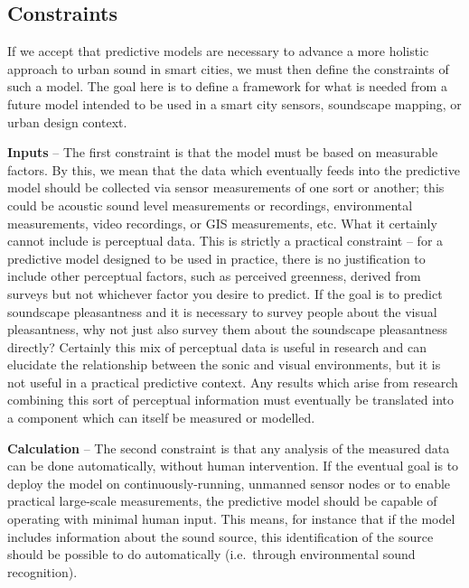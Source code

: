 \documentclass[
  authoryear,
  preprint,
  1p]{elsarticle}
\begin{document}
\subsection{Constraints}\label{constraints}

If we accept that predictive models are necessary to advance a more
holistic approach to urban sound in smart cities, we must then define
the constraints of such a model. The goal here is to define a framework
for what is needed from a future model intended to be used in a smart
city sensors, soundscape mapping, or urban design context.

\textbf{Inputs} -- The first constraint is that the model must be based
on measurable factors. By this, we mean that the data which eventually
feeds into the predictive model should be collected via sensor
measurements of one sort or another; this could be acoustic sound level
measurements or recordings, environmental measurements, video
recordings, or GIS measurements, etc. What it certainly cannot include
is perceptual data. This is strictly a practical constraint -- for a
predictive model designed to be used in practice, there is no
justification to include other perceptual factors, such as perceived
greenness, derived from surveys but not whichever factor you desire to
predict. If the goal is to predict soundscape pleasantness and it is
necessary to survey people about the visual pleasantness, why not just
also survey them about the soundscape pleasantness directly? Certainly
this mix of perceptual data is useful in research and can elucidate the
relationship between the sonic and visual environments, but it is not
useful in a practical predictive context. Any results which arise from
research combining this sort of perceptual information must eventually
be translated into a component which can itself be measured or modelled.

\textbf{Calculation} -- The second constraint is that any analysis of
the measured data can be done automatically, without human intervention.
If the eventual goal is to deploy the model on continuously-running,
unmanned sensor nodes or to enable practical large-scale measurements,
the predictive model should be capable of operating with minimal human
input. This means, for instance that if the model includes information
about the sound source, this identification of the source should be
possible to do automatically (i.e.~through environmental sound
recognition).
\end{document}
